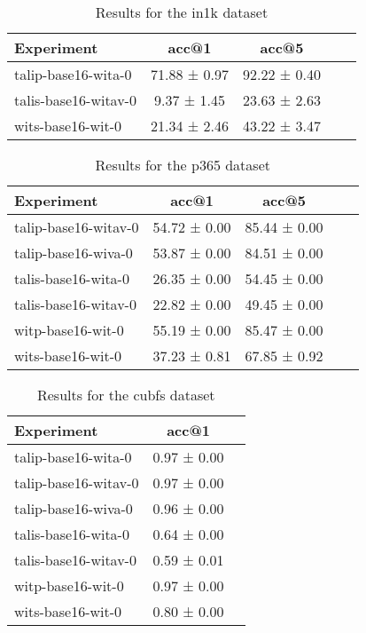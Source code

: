 \begin{table}[htbp]
\caption{Results for the in1k dataset}
\begin{tabular}{|l|c|c|c|c|}\hline
Experiment & acc@1 & acc@5\\
\hline
talip-base16-wita-0 & 71.88 ± 0.97 & 92.22 ± 0.40\\
\hline
talis-base16-witav-0 & 9.37 ± 1.45 & 23.63 ± 2.63\\
\hline
wits-base16-wit-0 & 21.34 ± 2.46 & 43.22 ± 3.47\\
\hline
\end{tabular}
\end{table}

\begin{table}[htbp]
\caption{Results for the p365 dataset}
\begin{tabular}{|l|c|c|c|c|}\hline
Experiment & acc@1 & acc@5\\
\hline
talip-base16-witav-0 & 54.72 ± 0.00 & 85.44 ± 0.00\\
\hline
talip-base16-wiva-0 & 53.87 ± 0.00 & 84.51 ± 0.00\\
\hline
talis-base16-wita-0 & 26.35 ± 0.00 & 54.45 ± 0.00\\
\hline
talis-base16-witav-0 & 22.82 ± 0.00 & 49.45 ± 0.00\\
\hline
witp-base16-wit-0 & 55.19 ± 0.00 & 85.47 ± 0.00\\
\hline
wits-base16-wit-0 & 37.23 ± 0.81 & 67.85 ± 0.92\\
\hline
\end{tabular}
\end{table}

\begin{table}[htbp]
\caption{Results for the cubfs dataset}
\begin{tabular}{|l|c|c|}\hline
Experiment & acc@1\\
\hline
talip-base16-wita-0 & 0.97 ± 0.00\\
\hline
talip-base16-witav-0 & 0.97 ± 0.00\\
\hline
talip-base16-wiva-0 & 0.96 ± 0.00\\
\hline
talis-base16-wita-0 & 0.64 ± 0.00\\
\hline
talis-base16-witav-0 & 0.59 ± 0.01\\
\hline
witp-base16-wit-0 & 0.97 ± 0.00\\
\hline
wits-base16-wit-0 & 0.80 ± 0.00\\
\hline
\end{tabular}
\end{table}

